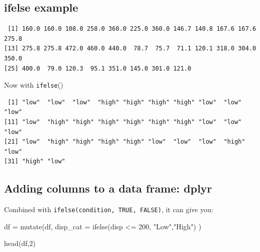 \documentclass[
]{article}
\newenvironment{Shaded}{\begin{snugshade}}{\end{snugshade}}
\newcommand{\AttributeTok}[1]{\textcolor[rgb]{0.77,0.63,0.00}{#1}}
\newcommand{\CommentTok}[1]{\textcolor[rgb]{0.56,0.35,0.01}{\textit{#1}}}
\newcommand{\DecValTok}[1]{\textcolor[rgb]{0.00,0.00,0.81}{#1}}
\newcommand{\FunctionTok}[1]{\textcolor[rgb]{0.00,0.00,0.00}{#1}}
\newcommand{\NormalTok}[1]{#1}
\newcommand{\OtherTok}[1]{\textcolor[rgb]{0.56,0.35,0.01}{#1}}
\newcommand{\SpecialCharTok}[1]{\textcolor[rgb]{0.00,0.00,0.00}{#1}}
\newcommand{\StringTok}[1]{\textcolor[rgb]{0.31,0.60,0.02}{#1}}
\begin{document}
\hypertarget{ifelse-example}{%
\subsection{ifelse example}\label{ifelse-example}}

\begin{Shaded}
\end{Shaded}

\begin{verbatim}
 [1] 160.0 160.0 108.0 258.0 360.0 225.0 360.0 146.7 140.8 167.6 167.6 275.8
[13] 275.8 275.8 472.0 460.0 440.0  78.7  75.7  71.1 120.1 318.0 304.0 350.0
[25] 400.0  79.0 120.3  95.1 351.0 145.0 301.0 121.0
\end{verbatim}

Now with \texttt{ifelse}()

\begin{Shaded}
\end{Shaded}

\begin{verbatim}
 [1] "low"  "low"  "low"  "high" "high" "high" "high" "low"  "low"  "low" 
[11] "low"  "high" "high" "high" "high" "high" "high" "low"  "low"  "low" 
[21] "low"  "high" "high" "high" "high" "low"  "low"  "low"  "high" "low" 
[31] "high" "low" 
\end{verbatim}

\hypertarget{adding-columns-to-a-data-frame-dplyr}{%
\subsection{Adding columns to a data frame:
dplyr}\label{adding-columns-to-a-data-frame-dplyr}}

Combined with \texttt{ifelse(condition,\ TRUE,\ FALSE)}, it can give
you:

\begin{Shaded}
\begin{Highlighting}[]
\NormalTok{df }\OtherTok{=} \FunctionTok{mutate}\NormalTok{(df, }
            \AttributeTok{disp\_cat =} \FunctionTok{ifelse}\NormalTok{(disp }\SpecialCharTok{\textless{}=} \DecValTok{200}\NormalTok{, }\StringTok{"Low"}\NormalTok{,}\StringTok{"High"}\NormalTok{)}
\NormalTok{            )}

\FunctionTok{head}\NormalTok{(df,}\DecValTok{2}\NormalTok{)}
\end{Highlighting}
\end{Shaded}
\end{document}
